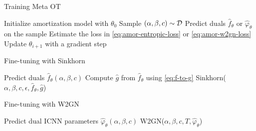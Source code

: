 
\begin{minipage}[t]{0.49\textwidth}
\begin{algorithm}[H]
    \caption{Training Meta OT}
    \begin{algorithmic}
    \footnotesize
    \State Initialize amortization model with $\theta_0$
    \State Sample $(\alpha, \beta, c)\sim{\mathcal{D}}$
    \State Predict duals $\hat f_\theta$ or $\hat \varphi_\theta$ on the sample
    \State Estimate the loss in \cref{eq:amor-entropic-loss} or \cref{eq:amor-w2gn-loss}
    \State Update $\theta_{i+1}$ with a gradient step
    \EndFor
    \end{algorithmic}
    \label{alg:meta-ot-training}
\end{algorithm}
\end{minipage}
\hfill
\begin{minipage}[t]{0.49\textwidth}
\begin{algorithm}[H]
    \caption{Fine-tuning with Sinkhorn}
    \begin{algorithmic}
    \footnotesize
    \State Predict duals $\hat f_\theta(\alpha, \beta, c)$
    \State Compute $\hat g$ from $\hat f_\theta$ using \cref{eq:f-to-g}
    \State \Return Sinkhorn($\alpha, \beta, c, \epsilon, \hat f_\theta, \hat g$)
    \end{algorithmic}
    \label{alg:sinkhorn-finetuning}
\end{algorithm}
\vspace*{-5mm}
\begin{algorithm}[H]
    \caption{Fine-tuning with W2GN}
    \begin{algorithmic}
    \footnotesize
    \State Predict dual ICNN parameters $\hat \varphi_\theta(\alpha, \beta, c)$
    \State \Return W2GN($\alpha, \beta, c, T, \hat \varphi_\theta$)
    \end{algorithmic}
    \label{alg:w2gn-finetuning}
\end{algorithm}
\end{minipage}

